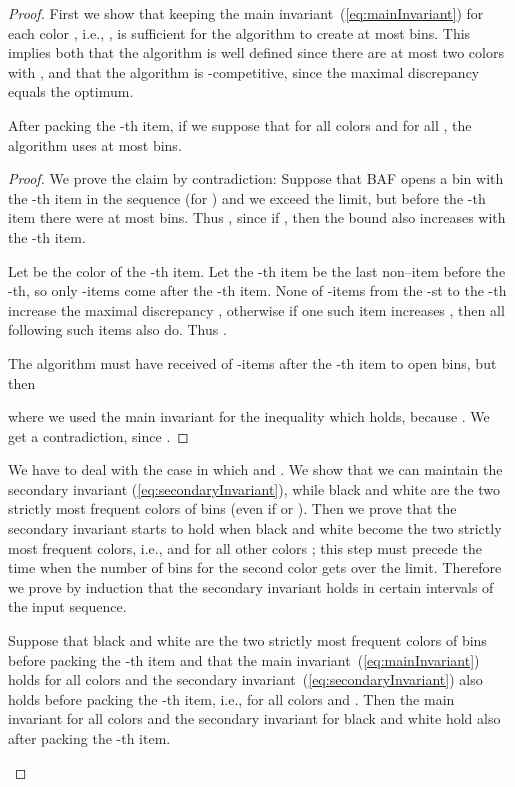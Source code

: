 \documentclass[11pt,a4paper]{article}
\begin{document}
\begin{proof} 
First we show that keeping the main invariant~(\ref{eq:mainInvariant})
for each color , i.e., , is sufficient
for the algorithm to create at most  bins. This
implies both that the algorithm is well defined since there are at
most two colors with , and that the algorithm
is -competitive, since the maximal discrepancy equals the optimum.

\begin{claim}
\label{cl:BAFineqForColors}
After packing the -th item,
if we suppose that  for all colors  and for all ,
the algorithm uses at most  bins.
\end{claim}

\begin{proof}
We prove the claim by contradiction:
Suppose that BAF opens a bin with the -th item
in the sequence (for ) and we exceed the  limit,
but before the -th item there were at most  bins.
Thus , since if , then the
bound also increases with the -th item.

Let  be the color of the -th item. Let the -th item be the last non--item before the -th, so only
-items come after the -th item.
None of -items from the -st to the -th increase the maximal discrepancy ,
otherwise if one such item increases , then all following such items also do.
Thus .

The algorithm must have received  of
-items after the -th item to open  bins, but then

where we used the main invariant for the inequality which holds, because .
We get a contradiction, since .
\end{proof}

We have to deal with the case in which  and
.  We show that we can maintain the
secondary invariant (\ref{eq:secondaryInvariant}), while black and
white are the two strictly most frequent colors of bins
(even if  or
). Then we prove
that the secondary invariant starts to hold when black and white
become the two strictly most frequent colors, i.e.,
 and  for all other colors ;
this step must precede the time when the number of bins for the second color gets over the
 limit.
Therefore we prove by induction that the secondary invariant holds
in certain intervals of the input sequence.

\begin{claim} \label{clm:OptAlgInductionSecondary}
Suppose that black and white are the two strictly most frequent colors of bins
before packing the -th item and that the main invariant~(\ref{eq:mainInvariant}) holds for all
colors and the secondary invariant~(\ref{eq:secondaryInvariant}) also holds before packing the -th item, i.e., 
 for all colors  and
.
Then the main invariant for all colors and the secondary invariant for black and white hold also after packing the -th item.
\end{claim}


\end{proof}
\end{document}
